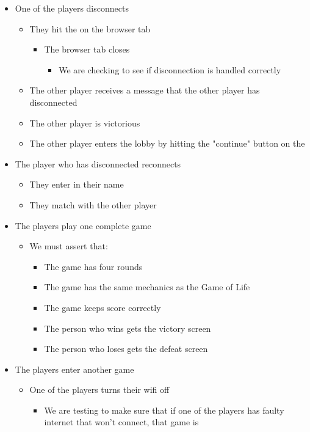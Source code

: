 \documentclass[11pt]{article}
\begin{document}
\begin{itemize}
\begin{itemize}
\begin{itemize}
\end{itemize}
\end{itemize}
\item One of the players disconnects
\begin{itemize}
\item They hit the \texttimes{} on the browser tab
\begin{itemize}
\item The browser tab closes
\begin{itemize}
\item We are checking to see if disconnection is handled correctly
\end{itemize}
\end{itemize}
\item The other player receives a message that the other player has disconnected
\item The other player is victorious
\item The other player enters the lobby by hitting the "continue" button on the
\end{itemize}
\item The player who has disconnected reconnects
\begin{itemize}
\item They enter in their name
\item They match with the other player
\end{itemize}
\item The players play one complete game
\begin{itemize}
\item We must assert that:
\begin{itemize}
\item The game has four rounds
\item The game has the same mechanics as the Game of Life
\item The game keeps score correctly
\item The person who wins gets the victory screen
\item The person who loses gets the defeat screen
\end{itemize}
\end{itemize}
\item The players enter another game
\begin{itemize}
\item One of the players turns their wifi off
\begin{itemize}
\item We are testing to make sure that if one of the players has faulty internet that won't connect, that game is

\end{itemize}
\end{itemize}
\end{itemize}
\end{document}

